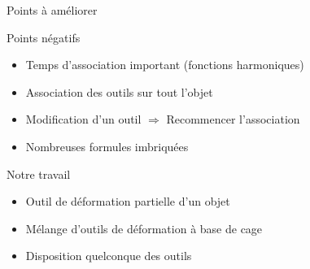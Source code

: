 \documentclass[xcolor=x11names,compress]{beamer}
\renewcommand{\(}{\begin{columns}} \renewcommand{\)}{\end{columns}}
\newcommand{\<}[1]{\begin{column}{#1}} \renewcommand{\>}{\end{column}}
\begin{document}
\begin{frame}{Points à améliorer}
  \begin{alertblock}{Points négatifs}
    \begin{itemize}
      \item Temps d'association important (fonctions harmoniques)
      \item Association des outils sur tout l'objet
      \item Modification d'un outil $\Rightarrow$ Recommencer
      l'association
      \item Nombreuses formules imbriquées
    \end{itemize}
  \end{alertblock}
  \begin{block}{Notre travail}
    \begin{itemize}
      \item Outil de déformation partielle d'un objet
      \item Mélange d'outils de déformation à base de cage
      \item Disposition quelconque des outils
    \end{itemize}
  \end{block}
\end{frame}
\end{document}
